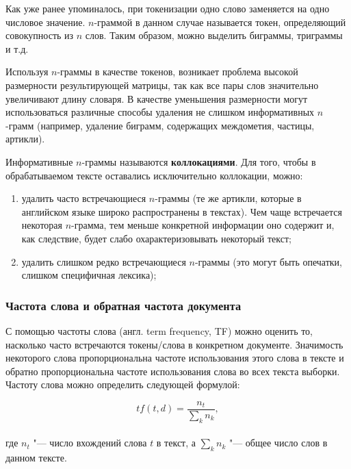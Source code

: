 \documentclass[bachelor, och, coursework]{SCWorks}
\begin{document}
            Как уже ранее упоминалось, при токенизации одно слово заменяется на
            одно числовое значение. $n$-граммой в данном случае называется
            токен, определяющий совокупность из $n$ слов. Таким образом, можно
            выделить биграммы, триграммы и т.д.

            Используя $n$-граммы в качестве токенов, возникает проблема высокой
            размерности результирующей матрицы, так как все пары слов
            значительно увеличивают длину словаря. В качестве уменьшения
            размерности могут использоваться различные способы удаления не
            слишком информативных $n$-грамм (например, удаление биграмм,
            содержащих междометия, частицы, артикли).

            Информативные $n$-граммы называются \textbf{коллокациями}.
            \cite{coll} Для того, чтобы в обрабатываемом тексте оставались
            исключительно коллокации, можно:

            \begin{enumerate}
                \item удалить часто встречающиеся $n$-граммы (те же артикли,
                которые в английском языке широко распространены в текстах). Чем
                чаще встречается некоторая $n$-грамма, тем меньше конкретной
                информации оно содержит и, как следствие, будет слабо
                охарактеризовывать некоторый текст;
                \item удалить слишком редко встречающиеся $n$-граммы (это могут
                быть опечатки, слишком специфичная лексика);
            \end{enumerate}

        \subsubsection{Частота слова и обратная частота документа}

            С помощью частоты слова (англ. term frequency, TF) можно оценить то,
            насколько часто встречаются токены/слова в конкретном документе.
            Значимость некоторого слова пропорциональна частоте использования
            этого слова в тексте и обратно пропорциональна частоте использования
            слова во всех текста выборки. Частоту слова можно определить
            следующей формулой:

            \begin{equation}
                tf(t, d) = \frac{n_t}{\sum_k n_k},
            \end{equation}
            \\
            где $n_t$ "--- число вхождений слова $t$ в текст, а $\sum_k n_k$
            "--- общее число слов в данном тексте.
\end{document}
